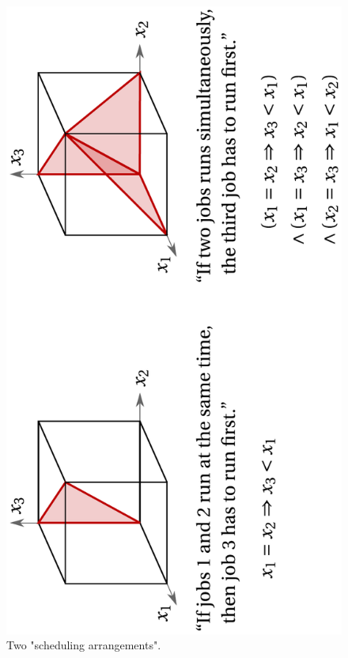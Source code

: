 \documentclass[11pt,letter]{amsart}
\begin{document}
\begin{figure}
\includegraphics[width=13cm]{schedule}
\caption{Two "scheduling arrangements".}
\end{figure}





\end{document}
